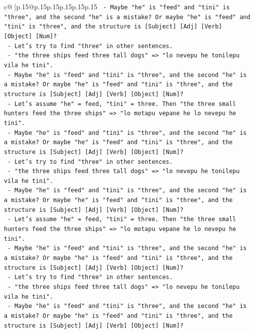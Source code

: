\documentclass{article}
\begin{document}
{\begin{supertabular}{c@{$\;$}|p{.15\linewidth}@{}p{.15\linewidth}p{.15\linewidth}p{.15\linewidth}p{.15\linewidth}p{.15\linewidth}}
{{{\texttt{             {-} Maybe "he" is "feed" and "tini" is "three", and the second "he" is a mistake? Or maybe "he" is "feed" and "tini" is "three", and the structure is {[}Subject{]} {[}Adj{]} {[}Verb{]} {[}Object{]} {[}Num{]}?} \\
\texttt{             {-} Let's try to find "three" in other sentences.} \\
\texttt{             {-} "the three ships feed three tall dogs" => "lo nevepu he tonilepu vila he tini".} \\
\texttt{             {-} Maybe "he" is "feed" and "tini" is "three", and the second "he" is a mistake? Or maybe "he" is "feed" and "tini" is "three", and the structure is {[}Subject{]} {[}Adj{]} {[}Verb{]} {[}Object{]} {[}Num{]}?} \\
\texttt{             {-} Let's assume "he" = feed, "tini" = three. Then "the three small hunters feed the three ships" => "lo motapu vepane he lo nevepu he tini".} \\
\texttt{             {-} Maybe "he" is "feed" and "tini" is "three", and the second "he" is a mistake? Or maybe "he" is "feed" and "tini" is "three", and the structure is {[}Subject{]} {[}Adj{]} {[}Verb{]} {[}Object{]} {[}Num{]}?} \\
\texttt{             {-} Let's try to find "three" in other sentences.} \\
\texttt{             {-} "the three ships feed three tall dogs" => "lo nevepu he tonilepu vila he tini".} \\
\texttt{             {-} Maybe "he" is "feed" and "tini" is "three", and the second "he" is a mistake? Or maybe "he" is "feed" and "tini" is "three", and the structure is {[}Subject{]} {[}Adj{]} {[}Verb{]} {[}Object{]} {[}Num{]}?} \\
\texttt{             {-} Let's assume "he" = feed, "tini" = three. Then "the three small hunters feed the three ships" => "lo motapu vepane he lo nevepu he tini".} \\
\texttt{             {-} Maybe "he" is "feed" and "tini" is "three", and the second "he" is a mistake? Or maybe "he" is "feed" and "tini" is "three", and the structure is {[}Subject{]} {[}Adj{]} {[}Verb{]} {[}Object{]} {[}Num{]}?} \\
\texttt{             {-} Let's try to find "three" in other sentences.} \\
\texttt{             {-} "the three ships feed three tall dogs" => "lo nevepu he tonilepu vila he tini".} \\
\texttt{             {-} Maybe "he" is "feed" and "tini" is "three", and the second "he" is a mistake? Or maybe "he" is "feed" and "tini" is "three", and the structure is {[}Subject{]} {[}Adj{]} {[}Verb{]} {[}Object{]} {[}Num{]}?} \\
}}}
\end{supertabular}}
\end{document}
